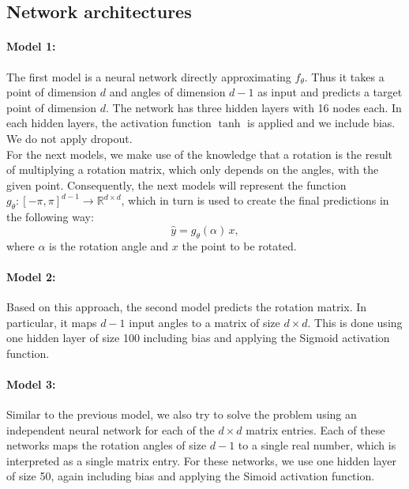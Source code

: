 \subsection{Network architectures}
\label{ssec:network_architectures}
\paragraph{Model 1:}The first model is a neural network directly approximating $f_\theta$. Thus it takes a point of dimension $d$ and angles of dimension $d-1$ as input and predicts a target point of dimension $d$. The network has three hidden layers with 16 nodes each. In each hidden layers, the activation function $\tanh$ is applied and we include bias. We do not apply dropout.\\

For the next models, we make use of the knowledge that a rotation is the result of multiplying a rotation matrix, which only depends on the angles, with the given point. Consequently, the next models will represent the function $g_\theta: [-\pi, \pi]^{d-1} \to \mathbb{R}^{d \times d}$, which in turn is used to create the final predictions in the following way:
\begin{equation}
\label{eq:rot_pred}
\hat{y} = g_\theta(\alpha) \, x,
\end{equation}
where $\alpha$ is the rotation angle and $x$ the point to be rotated.

\paragraph{Model 2:} Based on this approach, the second model predicts the rotation matrix. In particular, it maps $d-1$ input angles to a matrix of size $d \times d$. This is done using one hidden layer of size 100 including bias and applying the Sigmoid activation function. 

\paragraph{Model 3:} Similar to the previous model, we also try to solve the problem using an independent neural network for each of the $d \times d$ matrix entries. Each of these networks maps the rotation angles of size $d-1$ to a single real number, which is interpreted as a single matrix entry. For these networks, we use one hidden layer of size 50, again including bias and applying the Simoid activation function.\\

